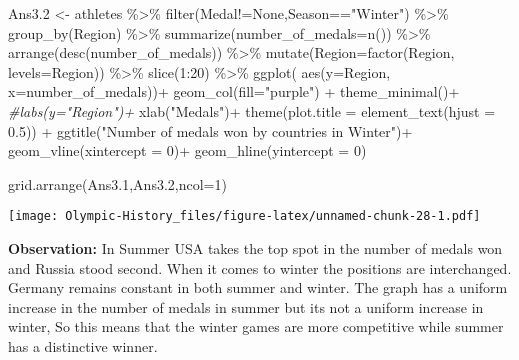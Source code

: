 \documentclass[
]{article}
\newenvironment{Shaded}{\begin{snugshade}}{\end{snugshade}}
\newcommand{\AttributeTok}[1]{\textcolor[rgb]{0.77,0.63,0.00}{#1}}
\newcommand{\CommentTok}[1]{\textcolor[rgb]{0.56,0.35,0.01}{\textit{#1}}}
\newcommand{\DecValTok}[1]{\textcolor[rgb]{0.00,0.00,0.81}{#1}}
\newcommand{\FloatTok}[1]{\textcolor[rgb]{0.00,0.00,0.81}{#1}}
\newcommand{\FunctionTok}[1]{\textcolor[rgb]{0.00,0.00,0.00}{#1}}
\newcommand{\NormalTok}[1]{#1}
\newcommand{\OtherTok}[1]{\textcolor[rgb]{0.56,0.35,0.01}{#1}}
\newcommand{\SpecialCharTok}[1]{\textcolor[rgb]{0.00,0.00,0.00}{#1}}
\newcommand{\StringTok}[1]{\textcolor[rgb]{0.31,0.60,0.02}{#1}}
\begin{document}
\begin{Shaded}
\begin{Highlighting}[]
\NormalTok{Ans3}\FloatTok{.2} \OtherTok{\textless{}{-}}
\NormalTok{athletes }\SpecialCharTok{\%\textgreater{}\%}
\FunctionTok{filter}\NormalTok{(Medal}\SpecialCharTok{!=}\StringTok{\textquotesingle{}None\textquotesingle{}}\NormalTok{,Season}\SpecialCharTok{==}\StringTok{"Winter"}\NormalTok{) }\SpecialCharTok{\%\textgreater{}\%}
\FunctionTok{group\_by}\NormalTok{(Region) }\SpecialCharTok{\%\textgreater{}\%}
\FunctionTok{summarize}\NormalTok{(}\AttributeTok{number\_of\_medals=}\FunctionTok{n}\NormalTok{()) }\SpecialCharTok{\%\textgreater{}\%}
\FunctionTok{arrange}\NormalTok{(}\FunctionTok{desc}\NormalTok{(number\_of\_medals)) }\SpecialCharTok{\%\textgreater{}\%}
\FunctionTok{mutate}\NormalTok{(}\AttributeTok{Region=}\FunctionTok{factor}\NormalTok{(Region, }\AttributeTok{levels=}\NormalTok{Region)) }\SpecialCharTok{\%\textgreater{}\%}
\FunctionTok{slice}\NormalTok{(}\DecValTok{1}\SpecialCharTok{:}\DecValTok{20}\NormalTok{) }\SpecialCharTok{\%\textgreater{}\%}
\FunctionTok{ggplot}\NormalTok{( }\FunctionTok{aes}\NormalTok{(}\AttributeTok{y=}\NormalTok{Region, }\AttributeTok{x=}\NormalTok{number\_of\_medals))}\SpecialCharTok{+}
\FunctionTok{geom\_col}\NormalTok{(}\AttributeTok{fill=}\StringTok{"purple"}\NormalTok{) }\SpecialCharTok{+}
\FunctionTok{theme\_minimal}\NormalTok{()}\SpecialCharTok{+}
\CommentTok{\#labs(y="Region")+}
\FunctionTok{xlab}\NormalTok{(}\StringTok{"Medals"}\NormalTok{)}\SpecialCharTok{+}
\FunctionTok{theme}\NormalTok{(}\AttributeTok{plot.title =} \FunctionTok{element\_text}\NormalTok{(}\AttributeTok{hjust =} \FloatTok{0.5}\NormalTok{)) }\SpecialCharTok{+}
\FunctionTok{ggtitle}\NormalTok{(}\StringTok{"Number of medals won by countries in Winter"}\NormalTok{)}\SpecialCharTok{+}
\FunctionTok{geom\_vline}\NormalTok{(}\AttributeTok{xintercept =} \DecValTok{0}\NormalTok{)}\SpecialCharTok{+}
\FunctionTok{geom\_hline}\NormalTok{(}\AttributeTok{yintercept =} \DecValTok{0}\NormalTok{)}

\FunctionTok{grid.arrange}\NormalTok{(Ans3}\FloatTok{.1}\NormalTok{,Ans3}\FloatTok{.2}\NormalTok{,}\AttributeTok{ncol=}\DecValTok{1}\NormalTok{)}
\end{Highlighting}
\end{Shaded}

\texttt{[image: Olympic-History\_files/figure-latex/unnamed-chunk-28-1.pdf]}

\textbf{Observation:} In Summer USA takes the top spot in the number of
medals won and Russia stood second. When it comes to winter the
positions are interchanged. Germany remains constant in both summer and
winter. The graph has a uniform increase in the number of medals in
summer but its not a uniform increase in winter, So this means that the
winter games are more competitive while summer has a distinctive winner.
\end{document}
